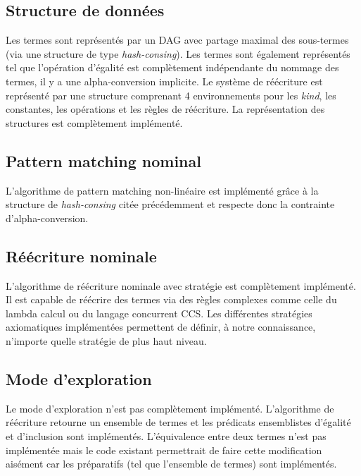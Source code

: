 \documentclass[12pt,a4paper]{article}
\begin{document}
\subsection{Structure de données}

Les termes sont représentés par un DAG avec partage maximal des sous-termes (via une structure de type \textit{hash-consing}). Les termes sont également représentés tel que l'opération d'égalité est complètement indépendante du nommage des termes, il y a une alpha-conversion implicite.
\newline
Le système de réécriture est représenté par une structure comprenant 4 environnements pour les \textit{kind}, les constantes, les opérations et les règles de réécriture.
\newline
La représentation des structures est complètement implémenté.

\subsection{Pattern matching nominal}

L'algorithme de pattern matching non-linéaire est implémenté grâce à la structure de \textit{hash-consing} citée précédemment et respecte donc la contrainte d'alpha-conversion.

\subsection{Réécriture nominale}

L'algorithme de réécriture nominale avec stratégie est complètement implémenté. Il est capable de réécrire des termes via des règles complexes comme celle du lambda calcul ou du langage concurrent CCS. Les différentes stratégies axiomatiques implémentées permettent de définir, à notre connaissance, n'importe quelle stratégie de plus haut niveau.

\subsection{Mode d'exploration}

Le mode d'exploration n'est pas complètement implémenté. L'algorithme de réécriture retourne un ensemble de termes et les prédicats ensemblistes d'égalité et d'inclusion sont implémentés. L'équivalence entre deux termes n'est pas implémentée mais le code existant permettrait de faire cette modification aisément car les préparatifs (tel que l'ensemble de termes) sont implémentés.
\end{document}
